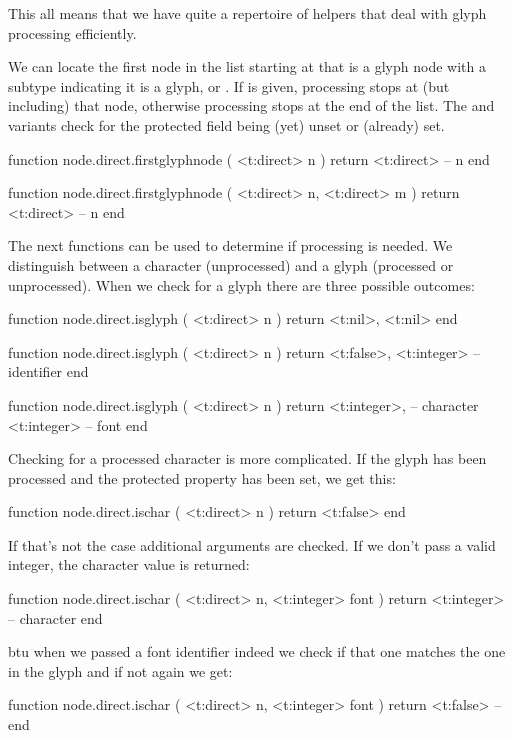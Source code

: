 This all means that we have quite a repertoire of helpers that deal with glyph
processing efficiently.

We can locate the first node in the list starting at  that is a glyph node
with a subtype indicating it is a glyph, or . If  is given,
processing stops at (but including) that node, otherwise processing stops at the
end of the list. The  and  variants check for the
protected field being (yet) unset or (already) set.

\starttyping[option=LUA]
function node.direct.firstglyphnode ( <t:direct> n )
    return <t:direct> -- n
end

function node.direct.firstglyphnode ( <t:direct> n, <t:direct> m )
    return <t:direct> -- n
end
\stoptyping

The next functions can be used to determine if processing is needed. We distinguish between
a character (unprocessed) and a glyph (processed or unprocessed). When we check for a glyph
there are three possible outcomes:

\starttyping[option=LUA]
function node.direct.isglyph ( <t:direct> n )
    return
        <t:nil>,
        <t:nil>
end

function node.direct.isglyph ( <t:direct> n )
    return
        <t:false>,
        <t:integer> -- identifier
end

function node.direct.isglyph ( <t:direct> n )
    return
        <t:integer>, -- character
        <t:integer>  -- font
end
\stoptyping

Checking for a processed character is more complicated. If the glyph has been processed and
the protected property has been set, we get this:

\starttyping[option=LUA]
function node.direct.ischar ( <t:direct> n )
    return <t:false>
end
\stoptyping

If that's not the case additional arguments are checked. If we don't pass a valid
integer, the character value is returned:

\starttyping[option=LUA]
function node.direct.ischar ( <t:direct> n, <t:integer> font )
    return <t:integer> -- character
end
\stoptyping

btu when we passed a font identifier indeed we check if that one matches the one in the
glyph and if not again we get:

\starttyping[option=LUA]
function node.direct.ischar ( <t:direct> n, <t:integer> font )
    return <t:false> --
end
\stoptyping

